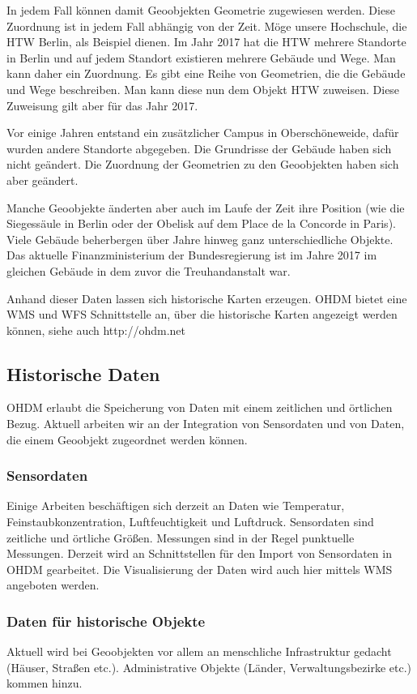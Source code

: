 In jedem Fall können damit Geoobjekten Geometrie zugewiesen werden. Diese Zuordnung ist
in jedem Fall abhängig von der Zeit. Möge unsere Hochschule, die HTW Berlin, als Beispiel
dienen. Im Jahr 2017 hat die HTW mehrere Standorte in Berlin und auf jedem Standort existieren
mehrere Gebäude und Wege. Man kann daher ein Zuordnung. Es gibt eine Reihe von Geometrien,
die die Gebäude und Wege beschreiben. Man kann diese nun dem Objekt HTW zuweisen. Diese 
Zuweisung gilt aber für das Jahr 2017.

Vor einige Jahren entstand ein zusätzlicher Campus in Oberschöneweide, dafür wurden andere
Standorte abgegeben. Die Grundrisse der Gebäude haben sich nicht geändert. Die Zuordnung
der Geometrien zu den Geoobjekten haben sich aber geändert. 

Manche Geoobjekte änderten aber auch im Laufe der Zeit ihre Position 
(wie die Siegessäule in Berlin oder der Obelisk auf dem Place de la Concorde in Paris).
Viele Gebäude beherbergen über Jahre hinweg ganz unterschiedliche Objekte. Das aktuelle
Finanzministerium der Bundesregierung ist im Jahre 2017 im gleichen Gebäude in dem zuvor die
Treuhandanstalt war.

Anhand dieser Daten lassen sich historische Karten erzeugen. OHDM bietet eine WMS und WFS
Schnittstelle an, über die historische Karten angezeigt werden können, siehe auch http://ohdm.net

\subsection{Historische Daten}
OHDM erlaubt die Speicherung von Daten mit einem zeitlichen und örtlichen Bezug.
Aktuell arbeiten wir an der Integration von Sensordaten und von Daten, die einem Geoobjekt
zugeordnet werden können.

\subsubsection{Sensordaten}
Einige Arbeiten beschäftigen sich derzeit an Daten wie Temperatur, Feinstaubkonzentration, Luftfeuchtigkeit 
und Luftdruck. Sensordaten sind zeitliche und örtliche Größen. Messungen sind in der Regel 
punktuelle Messungen. Derzeit wird an Schnittstellen für den Import von Sensordaten in OHDM gearbeitet.
Die Visualisierung der Daten wird auch hier mittels WMS angeboten werden.

\subsubsection{Daten für historische Objekte}
Aktuell wird bei Geoobjekten vor allem an menschliche Infrastruktur gedacht (Häuser, Straßen etc.).
Administrative Objekte (Länder, Verwaltungsbezirke etc.) kommen hinzu.

